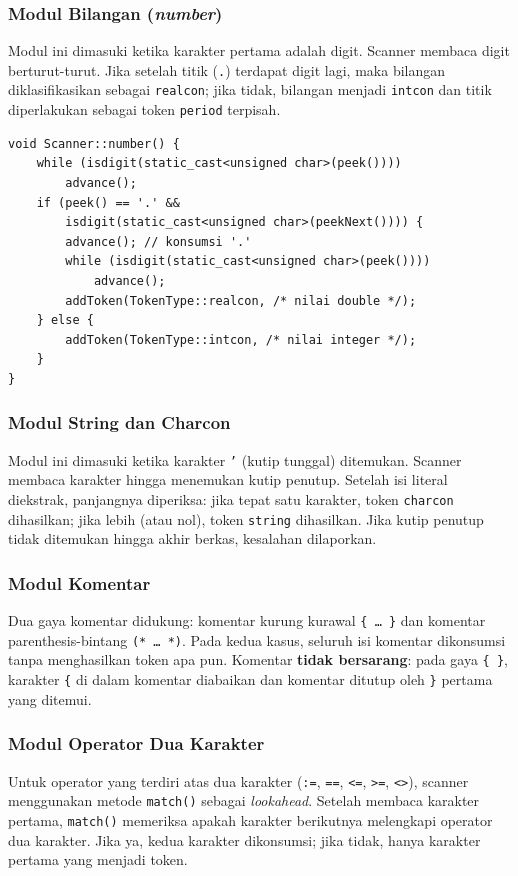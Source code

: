 \documentclass[12pt,a4paper]{article}
\begin{document}
\subsubsection{Modul Bilangan (\textit{number})}
Modul ini dimasuki ketika karakter pertama adalah digit. Scanner membaca digit berturut-turut. Jika setelah titik (\texttt{.}) terdapat digit lagi, maka bilangan diklasifikasikan sebagai \texttt{realcon}; jika tidak, bilangan menjadi \texttt{intcon} dan titik diperlakukan sebagai token \texttt{period} terpisah.

\begin{lstlisting}[style=cpp, caption={Penanganan bilangan bulat dan riil}]
void Scanner::number() {
    while (isdigit(static_cast<unsigned char>(peek())))
        advance();
    if (peek() == '.' &&
        isdigit(static_cast<unsigned char>(peekNext()))) {
        advance(); // konsumsi '.'
        while (isdigit(static_cast<unsigned char>(peek())))
            advance();
        addToken(TokenType::realcon, /* nilai double */);
    } else {
        addToken(TokenType::intcon, /* nilai integer */);
    }
}
\end{lstlisting}

\subsubsection{Modul String dan Charcon}
Modul ini dimasuki ketika karakter \texttt{'} (kutip tunggal) ditemukan. Scanner membaca karakter hingga menemukan kutip penutup. Setelah isi literal diekstrak, panjangnya diperiksa: jika tepat satu karakter, token \texttt{charcon} dihasilkan; jika lebih (atau nol), token \texttt{string} dihasilkan. Jika kutip penutup tidak ditemukan hingga akhir berkas, kesalahan dilaporkan.

\subsubsection{Modul Komentar}
Dua gaya komentar didukung: komentar kurung kurawal \texttt{\{ \ldots\ \}} dan komentar parenthesis-bintang \texttt{(* \ldots\ *)}. Pada kedua kasus, seluruh isi komentar dikonsumsi tanpa menghasilkan token apa pun. Komentar \textbf{tidak bersarang}: pada gaya \texttt{\{ \}}, karakter \texttt{\{} di dalam komentar diabaikan dan komentar ditutup oleh \texttt{\}} pertama yang ditemui.

\subsubsection{Modul Operator Dua Karakter}
Untuk operator yang terdiri atas dua karakter (\texttt{:=}, \texttt{==}, \texttt{<=}, \texttt{>=}, \texttt{<>}), scanner menggunakan metode \texttt{match()} sebagai \textit{lookahead}. Setelah membaca karakter pertama, \texttt{match()} memeriksa apakah karakter berikutnya melengkapi operator dua karakter. Jika ya, kedua karakter dikonsumsi; jika tidak, hanya karakter pertama yang menjadi token.
\end{document}
